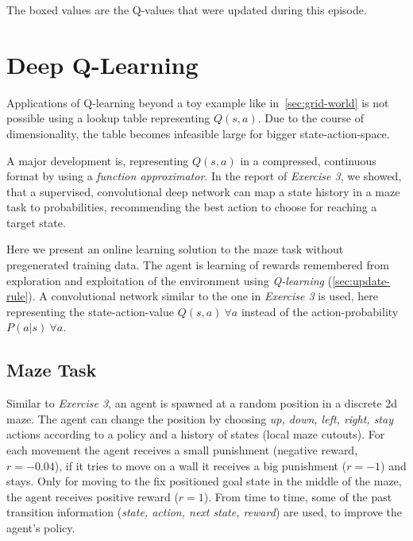 \documentclass[a4paper,14pt]{article}
\begin{document}
The boxed values are the Q-values that were updated during this episode. 
\section{Deep Q-Learning}\label{sec:deep-q-learning}

Applications of Q-learning beyond a toy example like
in~\autoref{sec:grid-world} is not possible using a lookup table representing
$Q(s, a)$.
Due to the course of dimensionality, the table becomes infeasible large for
bigger state-action-space.

A major development is, representing $Q(s, a)$ in a compressed, continuous
format by using a \textit{function approximator}.
In the report of \textit{Exercise 3}, we showed, that a supervised, convolutional
deep network can map a state history in a maze task to probabilities, recommending
the best action to choose for reaching a target state.

Here we present an online learning solution to the maze task without
pregenerated training data.
The agent is learning of rewards remembered from exploration and exploitation of the environment using
\textit{Q-learning} (\autoref{sec:update-rule}).
A convolutional network similar to the one in \textit{Exercise 3} is used, here
representing the state-action-value $Q(s, a)~\forall a$
 instead of the action-probability $P(a|s)~\forall a$.

\subsection{Maze Task}

Similar to \textit{Exercise 3}, an agent is spawned at a random position in a
discrete 2d maze. The agent can change the position by choosing \textit{up, down, left, right, stay}
actions according to a policy and a history of states (local maze cutouts).
For each movement the agent receives a small punishment (negative reward, $r=-0.04$), if it tries to move on
a wall it receives a big punishment ($r=-1$) and stays.
Only for moving to the fix positioned goal state in the middle of the maze, the
agent receives positive reward ($r=1$).
From time to time, some of the past transition information (\textit{state,
  action, next state, reward}) are used, to improve the agent's policy.
\end{document}
